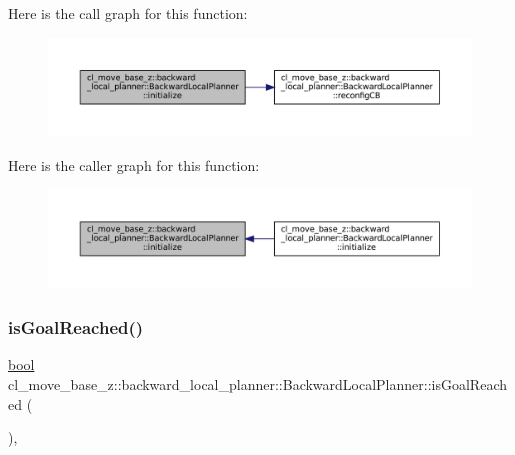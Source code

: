Here is the call graph for this function\+:
\nopagebreak
\begin{figure}[H]
\begin{center}
\leavevmode
\includegraphics[width=350pt]{classcl__move__base__z_1_1backward__local__planner_1_1BackwardLocalPlanner_a5c9815019cef272faed835cd8c575196_cgraph}
\end{center}
\end{figure}
Here is the caller graph for this function\+:
\nopagebreak
\begin{figure}[H]
\begin{center}
\leavevmode
\includegraphics[width=350pt]{classcl__move__base__z_1_1backward__local__planner_1_1BackwardLocalPlanner_a5c9815019cef272faed835cd8c575196_icgraph}
\end{center}
\end{figure}
\mbox{\label{classcl__move__base__z_1_1backward__local__planner_1_1BackwardLocalPlanner_a06a99e609ed31b97f765351dd6827722}} 
\subsubsection{\texorpdfstring{is\+Goal\+Reached()}{isGoalReached()}}
{\footnotesize\ttfamily \hyperlink{classbool}{bool} cl\+\_\+move\+\_\+base\+\_\+z\+::backward\+\_\+local\+\_\+planner\+::\+Backward\+Local\+Planner\+::is\+Goal\+Reached (\begin{DoxyParamCaption}{ }\end{DoxyParamCaption})\hspace{0.3cm}{\ttfamily [override]}, {\ttfamily [virtual]}}



